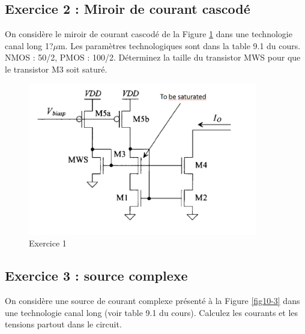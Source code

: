 \documentclass[paper=a4, fontsize=11pt]{article} %
\numberwithin{equation}{section} %
\numberwithin{figure}{section} %
\numberwithin{table}{section} %
\begin{document}
\subsection*{Exercice 2 : Miroir de courant cascodé}
On considère le miroir de courant cascodé de la Figure \ref{fig10-2} dans une technologie canal long 1?$\mu$m. Les paramètres technologiques sont dans la table 9.1 du cours. NMOS : 50/2, PMOS : 100/2.
Déterminez la taille du transistor MWS pour que le transistor M3 soit saturé.

\begin{figure}[!htbp]
   \centering
   \includegraphics[width=10cm]{figure/fig10-2.png}
   \caption{Exercice 1}
   \label{fig10-2}
\end{figure}

\subsection*{Exercice 3 : source complexe}
On considère une source de courant complexe présenté à la Figure \ref{fig10-3} dans une technologie canal long (voir table 9.1 du cours). Calculez les courants et les tensions partout dans le circuit.
\end{document}
